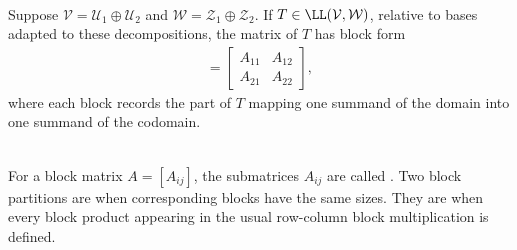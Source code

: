\begin{definition} \\
Suppose $\mathcal{V} = \mathcal{U}_1 \oplus \mathcal{U}_2$ and $\mathcal{W} = \mathcal{Z}_1 \oplus \mathcal{Z}_2$. If $T \in \LL(\mathcal{V}, \mathcal{W})$, relative to bases adapted to these decompositions, the matrix of $T$ has block form
\begin{align}
[T] =
\begin{bmatrix}
A_{11} & A_{12} \\
A_{21} & A_{22}
\end{bmatrix}, \nonumber
\end{align}
where each block records the part of $T$ mapping one summand of the domain into one summand of the codomain.
\end{definition}

\begin{definition} \\
For a block matrix $A=[A_{ij}]$, the submatrices $A_{ij}$ are called . Two block partitions are  when corresponding blocks have the same sizes. They are  when every block product appearing in the usual row-column block multiplication is defined.
\end{definition}


